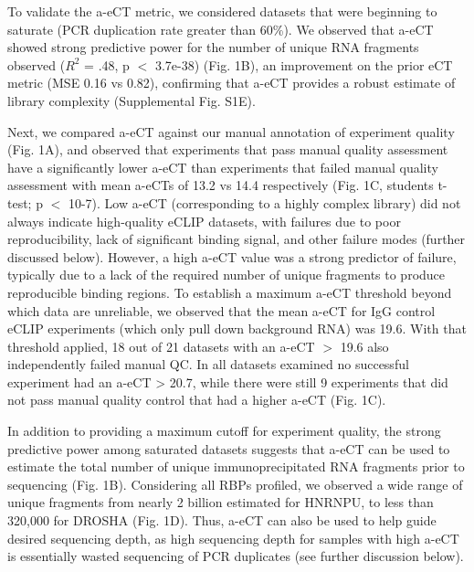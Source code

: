 To validate the a-eCT metric, we considered datasets that were beginning to saturate (PCR duplication rate greater than 60\%). We observed that a-eCT showed strong predictive power for the number of unique RNA fragments observed ($R^2$ = .48, p $<$ 3.7e-38) (Fig. 1B), an improvement on the prior eCT metric (MSE 0.16 vs 0.82), confirming that a-eCT provides a robust estimate of library complexity (Supplemental Fig. S1E).

Next, we compared a-eCT against our manual annotation of experiment quality (Fig. 1A), and observed that experiments that pass manual quality assessment have a significantly lower a-eCT than experiments that failed manual quality assessment with mean a-eCTs of 13.2 vs 14.4 respectively (Fig. 1C, students t-test; p $<$ 10-7). Low a-eCT (corresponding to a highly complex library) did not always indicate high-quality eCLIP datasets, with failures due to poor reproducibility, lack of significant binding signal, and other failure modes (further discussed below). However, a high a-eCT value was a strong predictor of failure, typically due to a lack of the required number of unique fragments to produce reproducible binding regions. To establish a maximum a-eCT threshold beyond which data are unreliable, we observed that the mean a-eCT for IgG control eCLIP experiments (which only pull down background RNA) was 19.6. With that threshold applied, 18 out of 21 datasets with an a-eCT $>$ 19.6 also independently failed manual QC. In all datasets examined no successful experiment had an a-eCT > 20.7, while there were still 9 experiments that did not pass manual quality control that had a higher a-eCT (Fig. 1C).

In addition to providing a maximum cutoff for experiment quality, the strong predictive power among saturated datasets suggests that a-eCT can be used to estimate the total number of unique immunoprecipitated RNA fragments prior to sequencing (Fig. 1B). Considering all RBPs profiled, we observed a wide range of unique fragments from nearly 2 billion estimated for HNRNPU, to less than 320,000 for DROSHA (Fig. 1D). Thus, a-eCT can also be used to help guide desired sequencing depth, as high sequencing depth for samples with high a-eCT is essentially wasted sequencing of PCR duplicates (see further discussion below).


